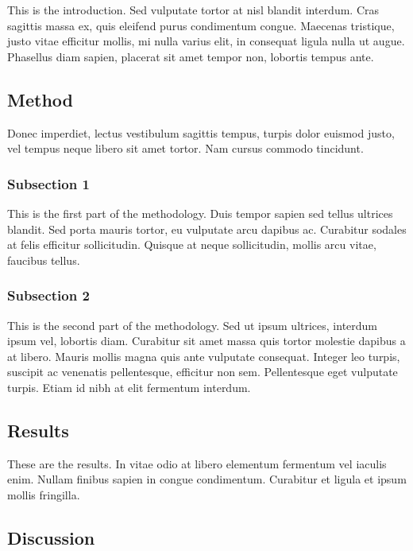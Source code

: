 \documentclass[11pt,letterpaper,]{article}
\begin{document}
This is the introduction. Sed vulputate tortor at nisl blandit interdum.
Cras sagittis massa ex, quis eleifend purus condimentum congue. Maecenas
tristique, justo vitae efficitur mollis, mi nulla varius elit, in
consequat ligula nulla ut augue. Phasellus diam sapien, placerat sit
amet tempor non, lobortis tempus ante.

\subsection{Method}\label{method-1}

Donec imperdiet, lectus vestibulum sagittis tempus, turpis dolor euismod
justo, vel tempus neque libero sit amet tortor. Nam cursus commodo
tincidunt.

\subsubsection{Subsection 1}\label{subsection-1}

This is the first part of the methodology. Duis tempor sapien sed tellus
ultrices blandit. Sed porta mauris tortor, eu vulputate arcu dapibus ac.
Curabitur sodales at felis efficitur sollicitudin. Quisque at neque
sollicitudin, mollis arcu vitae, faucibus tellus.

\subsubsection{Subsection 2}\label{subsection-2-1}

This is the second part of the methodology. Sed ut ipsum ultrices,
interdum ipsum vel, lobortis diam. Curabitur sit amet massa quis tortor
molestie dapibus a at libero. Mauris mollis magna quis ante vulputate
consequat. Integer leo turpis, suscipit ac venenatis pellentesque,
efficitur non sem. Pellentesque eget vulputate turpis. Etiam id nibh at
elit fermentum interdum.

\subsection{Results}\label{results-1}

These are the results. In vitae odio at libero elementum fermentum vel
iaculis enim. Nullam finibus sapien in congue condimentum. Curabitur et
ligula et ipsum mollis fringilla.

\subsection{Discussion}\label{discussion-1}
\end{document}

